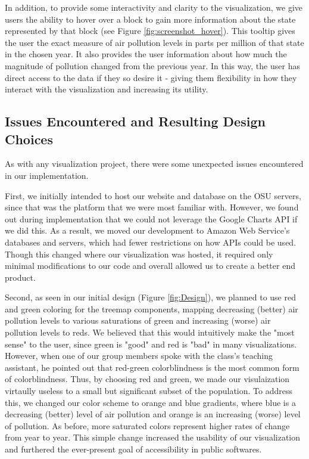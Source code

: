 \documentclass[journal]{vgtc}                %
\begin{document}
In addition, to provide some interactivity and clarity to the visualization, we give users the ability to hover over a block to 
gain more information about the state represented by that block (see Figure \ref{fig:screenshot_hover}). This tooltip gives the user the
exact measure of air pollution levels in parts per million of that state in the chosen year. It also provides the user information about
how much the magnitude of pollution changed from the previous year. In this way, the user has direct access to the data if they so desire it - 
giving them flexibility in how they interact with the visualization and increasing its utility.

\subsection{Issues Encountered and Resulting Design Choices}

As with any visualization project, there were some unexpected issues encountered in our implementation. 

First, we initially intended to host our website and database on the OSU servers, since that was the platform that we were
most familiar with. However, we found out during implementation that we could not leverage the Google Charts API if we did
this. As a result, we moved our development to Amazon Web Service's databases and servers, which had fewer restrictions on 
how APIs could be used. Though this changed where our visualization was hosted, it required only minimal modifications to 
our code and overall allowed us to create a better end product.

Second, as seen in our initial design (Figure \ref{fig:Design}), we planned to use red and green coloring for the treemap components, mapping
decreasing (better) air pollution levels to various saturations of green and increasing (worse) air pollution levels to reds. We believed
that this would intuitively make the "most sense" to the user, since green is "good" and red is "bad" in many visualizations. However, when
one of our group members spoke with the class's teaching assistant, he pointed out that red-green colorblindness is the most common form of
colorblindness. Thus, by choosing red and green, we made our visulaization virtaully useless to a small but significant subset of the population.
To address this, we changed our color scheme to orange and blue gradients, where blue is a decreasing (better) level of air pollution and orange
is an increasing (worse) level of pollution. As before, more saturated colors represent higher rates of change from year to year. This simple change
increased the usability of our visualization and furthered the ever-present goal of accessibility in public softwares.
\end{document}
